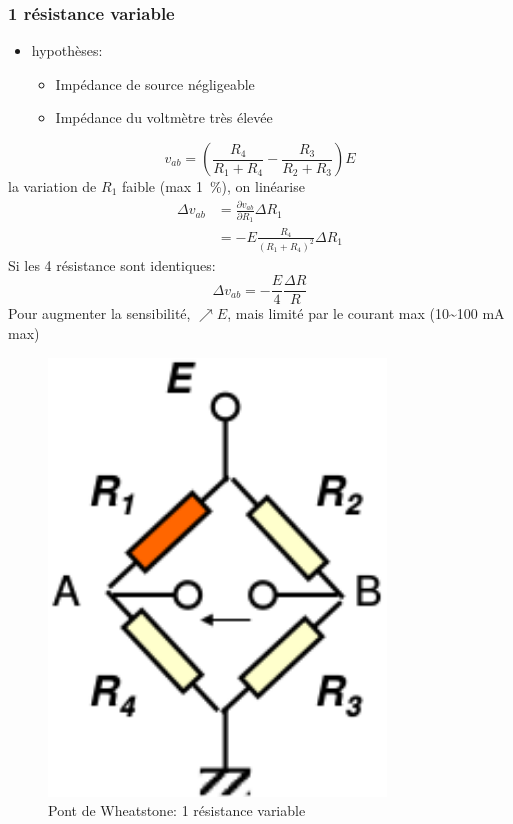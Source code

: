 \subsubsection{1 résistance variable}
\begin{minipage}[t]{0.8\textwidth}
	\begin{itemize}
		\item hypothèses:
		\begin{itemize}
			\item Impédance de source négligeable
			\item Impédance du voltmètre très élevée
		\end{itemize}
	\end{itemize}
	\[v_{ab} = \left(\frac{R_4}{R_1+R_4}-\frac{R_3}{R_2+R_3}\right)E\]
	la variation de \(R_1\) faible (max \SI{1}{\percent}), on linéarise
	\begin{align*}
		\Delta v_{ab} &= \frac{\partial v_{ab}}{\partial R_1}\Delta R_1\\
		&= -E\frac{R_4}{(R_1+R_4)^2}\Delta R_1
	\end{align*}
	Si les 4 résistance sont identiques:
	\[\Delta v_{ab} = -\frac{E}{4}\frac{\Delta R}{R}\]
	Pour augmenter la sensibilité, \(\nearrow E\), mais limité par le courant max (10\textasciitilde100 \si{\milli\ampere} max)
\end{minipage}\begin{minipage}[t]{0.2\textwidth}
\begin{figure}[H] 
	\centering 
	\includegraphics[width=0.8\textwidth,height=10\baselineskip,keepaspectratio]{ch4/image7} 
	\caption{Pont de Wheatstone: 1 résistance variable} 
\end{figure}
\end{minipage}
